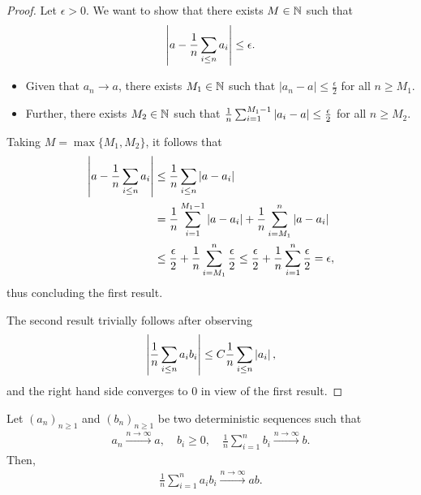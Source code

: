 \begin{proof}
    Let $\epsilon > 0$. We want to show that there exists $M \in \mathbb{N}$ such that 
    \begin{align*}
        \left|  a - \frac{1}{n} \sum_{i \leq n}a_{i} \right| \leq \epsilon. 
    \end{align*}
    \begin{itemize}
        \item Given that $a_n \to a$, there exists $M_1 \in \mathbb{N}$ such that $|a_n - a| \leq \frac{\epsilon}{2}$ for all $n \geq M_1$.
        \item Further, there exists $M_2 \in \mathbb{N}$ such that $\frac{1}{n}\sum_{i = 1}^{M_1-1} \left| a_i - a \right| \leq \frac{\epsilon}{2}$ for all $n \geq M_2$.
    \end{itemize}
    Taking $M = \max \{ M_1, M_2 \}$, it follows that 
    \begin{align*}
        \left|  a - \frac{1}{n} \sum_{i \leq n}a_{i} \right|  &\leq \frac{1}{n} \sum_{i \leq n} \left|  a - a_{i} \right| 
        \\&= \frac{1}{n} \sum_{i =1}^{M_1-1} \left|  a - a_{i} \right| +  \frac{1}{n} \sum_{i =M_1}^{n} \left|  a - a_{i} \right| 
        \\&\leq \frac{\epsilon}{2} + \frac{1}{n} \sum_{i =M_1}^{n} \frac{\epsilon}{2}
        \leq \frac{\epsilon}{2} + \frac{1}{n} \sum_{i =1}^{n} \frac{\epsilon}{2}
        = \epsilon,
    \end{align*}
    thus concluding the first result.

    The second result trivially follows after observing 
    \begin{align*}
        \left| \frac{1}{n} \sum_{i \leq n}a_{i} b_i \right|  \leq  C\frac{1}{n} \sum_{i \leq n} \left| a_{i} \right|,
    \end{align*}
    and the right hand side converges to $0$ in view of the first result.
\end{proof}


\begin{lemma} \label{lemma:aibiab}
    Let $(a_n)_{n \geq 1}$ and $(b_n)_{n \geq 1}$ be two deterministic sequences such that 
    \begin{align*}
        a_n \stackrel{n\to\infty}{\to} a, \quad b_i \geq 0, \quad \frac{1}{n}\sum_{i=1}^n b_i \stackrel{n\to\infty}{\to} b.
    \end{align*}
    Then,
    \begin{align*}
         \frac{1}{n}\sum_{i=1}^n a_i b_i \stackrel{n\to\infty}{\to} ab.
    \end{align*}
\end{lemma}

